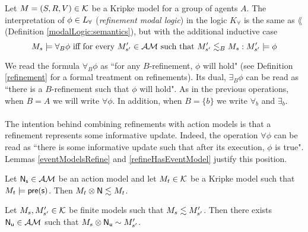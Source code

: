 \begin{defn} \label{refineLogic:semantics}
Let $M = (S, R, V) \in \mathcal{K}$ be a Kripke model for a group of agents $A$.
The interpretation of $\phi \in L_{\forall}$ ({\em refinement modal logic}) in the logic $K_\forall$ is the same as $\lang$
(Definition \ref{modalLogic:semantics}), but with the additional inductive case
\[
	M_s \models \forall_B \phi \text{ iff for every } M'_{s'} \in
  \mathcal{AM} \text{ such that } M'_{s'}
	\lesssim_B M_s : M'_{s'} \models \phi
\]
\end{defn}

We read the formula $\forall_B \phi$ as ``for any $B$-refinement, $\phi$ will hold" (see Definition
\ref{refinement} for a formal treatment on refinements).
Its dual, $\exists_B \phi$ can be read as ``there is a $B$-refinement such that $\phi$ will hold".
As in the previous operations, when $B = A$ we will write $\forall \phi$.
In addition, when $B = \{b\}$ we write $\forall_b$ and $\exists_b$.\\
\\
The intention behind combining refinements with action models is that a refinement represents some
informative update.
Indeed, the operation $\forall \phi$ can be read as ``there is some informative update such that
after its execution, $\phi$ is true".
Lemmas \ref{eventModelsRefine} and \ref{refineHasEventModel} justify this position.

\begin{lemma} \label{eventModelsRefine}
Let $\mathrm{\mathsf{\mathrm{\mathsf{N}}_s}} \in \mathcal{AM}$ be an action model and let $M_t \in \mathcal{K}$ be a Kripke
model such that $M_t \models \mathrm{\mathsf{pre(s)}}$.
Then $M_t \otimes \mathrm{\mathsf{\mathrm{\mathsf{N}}}} \lesssim M_t$.
\end{lemma}

\begin{lemma} \label{refineHasEventModel}
	Let $M_s, M'_{s'} \in \mathcal{K}$ be finite models such that $M_s \lesssim
	M'_{s'}$.
	Then there exists $\mathrm{\mathsf{N}}_\mathrm{\mathsf{u}} \in \mathcal{AM}$ such that $M_s \otimes \mathrm{\mathsf{N}}_\mathrm{\mathsf{u}} \sim
	M'_{s'}$.
\end{lemma}

